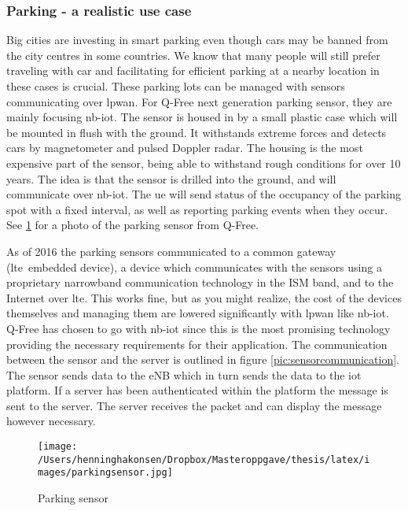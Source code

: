 \documentclass[USenglish]{ifimaster}  %
\begin{document}
\subsubsection{Parking - a realistic use case} \label{ssection:sensoroutline}
Big cities are investing in smart parking even though cars may be banned from the city centres in some countries. We know that many people will still prefer traveling with car and facilitating for efficient parking at a nearby location in these cases is crucial. These parking lots can be managed with sensors communicating over \acrshort{lpwan}. For Q-Free next generation parking sensor, they are mainly focusing \acrshort{nb-iot}. The sensor is housed in by a small plastic case which will be mounted in flush with the ground. It withstands extreme forces and detects cars by magnetometer and pulsed Doppler radar. The housing is the most expensive part of the sensor, being able to withstand rough conditions for over 10 years. The idea is that the sensor is drilled into the ground, and will communicate over \acrshort{nb-iot}. The \acrshort{ue} will send status of the occupancy of the parking spot with a fixed interval, as well as reporting parking events when they occur. See \ref{pic:parkingsensor} for a photo of the parking sensor from Q-Free.

As of 2016 the parking sensors communicated to a common gateway (\acrshort{lte} embedded device), a device which communicates with the sensors using a proprietary narrowband communication technology in the ISM band, and to the Internet over \acrshort{lte}. This works fine, but as you might realize, the cost of the devices themselves and managing them are lowered significantly with \acrshort{lpwan} like \acrshort{nb-iot}. Q-Free has chosen to go with \acrshort{nb-iot} since this is the most promising technology providing the necessary requirements for their application. The communication between the sensor and the server is outlined in figure \vref{pic:sensorcommunication}. The sensor sends data to the eNB which in turn sends the data to the \acrshort{iot} platform. If a server has been authenticated within the platform the message is sent to the server. The server receives the packet and can display the message however necessary.

\begin{figure}[H]
  \centering\texttt{[image: /Users/henninghakonsen/Dropbox/Masteroppgave/thesis/latex/images/parkingsensor.jpg]}
  \caption[Parking sensor]{Parking sensor \cite{person:ola}}
  \label{pic:parkingsensor}
\end{figure}
\end{document}
